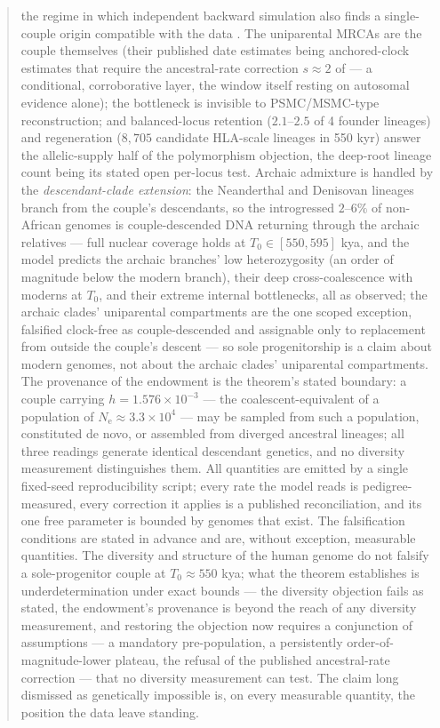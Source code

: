 \documentclass[11pt,a4paper]{article}
\newcommand{\Ne}{N_{\mathrm{e}}}
\begin{document}
\begin{abstract}
the regime in which independent backward simulation also finds a
single-couple origin compatible with the data \citep{HossjerGauger2019}.
The uniparental MRCAs are the couple themselves (their published date
estimates being anchored-clock estimates that require the ancestral-rate
correction $s \approx 2$ of \citealp{Scally2012} --- a conditional,
corroborative layer, the window itself resting on autosomal evidence
alone); the bottleneck is
invisible to PSMC/MSMC-type reconstruction; and balanced-locus retention
($2.1$--$2.5$ of 4 founder lineages) and regeneration ($8{,}705$ candidate
HLA-scale lineages in 550 kyr) answer the allelic-supply half of the
polymorphism objection, the deep-root lineage count being its stated
open per-locus test. Archaic
admixture is handled by the \emph{descendant-clade extension}: the
Neanderthal and Denisovan lineages branch from the couple's descendants, so
the introgressed $2$--$6\%$ of non-African genomes is couple-descended DNA
returning through the archaic relatives --- full nuclear coverage holds at
$T_0 \in [550, 595]$ kya, and the model predicts the archaic branches' low
heterozygosity (an order of magnitude below the modern branch), their deep
cross-coalescence with moderns at $T_0$, and their extreme internal
bottlenecks, all as observed; the archaic clades' uniparental compartments
are the one scoped exception, falsified clock-free as couple-descended and
assignable only to replacement from outside the couple's descent
\citep{Mendez2016,Posth2017} --- so sole progenitorship is a claim about
modern genomes, not about the archaic clades' uniparental compartments.
The provenance of the endowment is the theorem's stated boundary: a couple
carrying $h = 1.576\times10^{-3}$ --- the coalescent-equivalent of a
population of $\Ne \approx 3.3\times10^{4}$ --- may be sampled from such a
population, constituted de novo, or assembled from diverged ancestral
lineages; all three readings generate identical descendant genetics, and
no diversity measurement distinguishes them. All quantities are emitted by
a single fixed-seed reproducibility script; every rate the model reads is
pedigree-measured, every correction it applies is a published
reconciliation, and its one free parameter is bounded by genomes that
exist. The falsification conditions are stated in advance and are,
without exception, measurable quantities. The diversity and structure of
the human genome do not falsify a sole-progenitor couple at
$T_0 \approx 550$ kya; what the theorem establishes is underdetermination
under exact bounds --- the diversity objection fails as stated, the
endowment's provenance is beyond the reach of any diversity measurement,
and restoring the objection now requires a conjunction of assumptions ---
a mandatory pre-population, a persistently order-of-magnitude-lower
plateau, the refusal of the published ancestral-rate correction --- that
no diversity measurement can test. The claim long dismissed as
genetically impossible is, on every measurable quantity, the position the
data leave standing.
\end{abstract}
\end{document}
